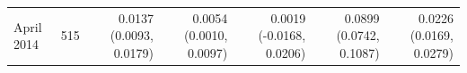 \begin{tabular}{lrrrrrr}
April 2014 & 515 & 0.0137 (0.0093, 0.0179) & 0.0054 (0.0010, 0.0097) & 0.0019 (-0.0168, 0.0206) & 0.0899 (0.0742, 0.1087) & 0.0226 (0.0169, 0.0279) \\

\end{tabular}
